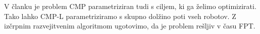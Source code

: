 \documentclass{article}
\newtheorem{definicija}{Definicija}
\begin{document}

V članku je problem CMP parametriziran tudi s ciljem, ki ga želimo optimizirati. Tako lahko CMP-L parametriziramo s skupno dolžino poti vseh robotov. Z izčrpnim razvejitvenim algoritmom ugotovimo, da je problem rešljiv v času FPT.
\end{document}

